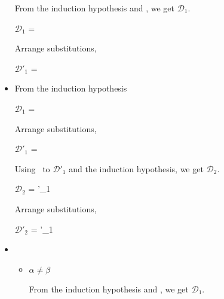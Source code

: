 \begin{itemize}
	      From the induction hypothesis and \QAbs, we get $\mathcal{D}_1$.
	      	      	      
	      $\mathcal{D}_1$ = 
	      { \andalso {}}
	      	      	      
	      Arrange substitutions,
	      	      	      
	      $\mathcal{D}'_1$ = 
	      { \andalso {}}
	      	      	      
	\item \QApp
	      	      	      
	      From the induction hypothesis
	      	      	      
	      $\mathcal{D}_1$ = 
	      	      	      
	      Arrange substitutions,
	      	      	      
	      $\mathcal{D}'_1$ = 
	      	      	      
	      Using \QApp\ to $\mathcal{D}'_1$ and the induction hypothesis, we get $\mathcal{D}_2$.
	      	      	      
	      $\mathcal{D}_2$ = 
	      {'_1 \andalso {}}
	      	      	      
	      Arrange substitutions,
	      	      	      
	      $\mathcal{D}'_2$ = 
	      {'_1 \andalso {}}
	      	      	      
	\item \QTB
	      	      	      
	      \begin{itemize}
	      		      		      	
	      	\item $\alpha \neq \beta$
	      	      	      	      	      	      
	      	      From the induction hypothesis and \QTB, we get $\mathcal{D}_1$.
	      	      	      	      	      	      

\end{itemize}
\end{itemize}
